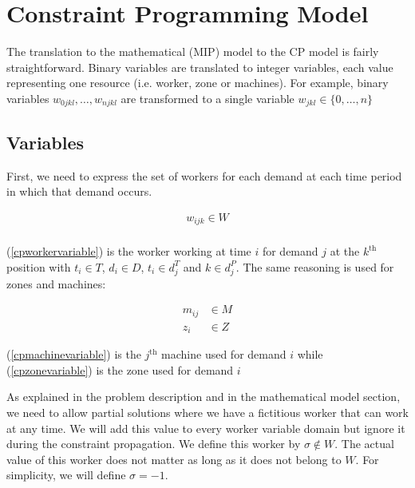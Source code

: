 \documentclass[../../thesis.tex]{subfiles}
\begin{document}
\section{Constraint Programming Model}
\label{section:cpmodel}

The translation to the mathematical (MIP) model to the CP model is fairly
straightforward. Binary variables are translated to integer variables, each value representing
one resource (i.e. worker, zone or machines). 
For example, binary variables $w_{0jkl}, \dots, w_{njkl}$ are transformed to a single variable 
$w_{jkl} \in \{0, \dots, n\}$



\subsection{Variables}

First, we need to express the set of workers for each demand at each time period in which that demand occurs.

\begin{equation}
\begin{split}
    w_{ijk} \in W \label{cpworkervariable} \\
\end{split}
\end{equation}

(\ref{cpworkervariable}) is the worker working at time $i$ for demand $j$ at the $k^{\text{th}}$ position 
with $t_i \in T$, $d_i \in D$, $t_i \in d_j^T$ and $k \in d^P_j$. The same reasoning is used for zones and machines:

\begin{align}
    m_{ij} &\in M \label{cpmachinevariable} \\ 
    z_i &\in Z \label{cpzonevariable} 
\end{align}

(\ref{cpmachinevariable}) is the $j^{\text{th}}$ machine used for demand $i$ while (\ref{cpzonevariable}) is the zone used for demand $i$



As explained in the problem description and in the mathematical model section,
we need to allow partial solutions where we have a fictitious worker that can work at any time.
We will add this value to every worker variable domain but ignore it during the constraint propagation. We define 
this worker by $\sigma \notin W$. The actual value of this worker does not matter as long as it does not belong to $W$. For simplicity, we will define $\sigma = -1$.
\end{document}
